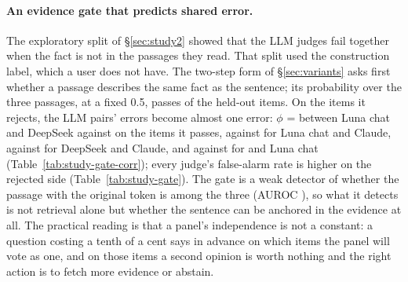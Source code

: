 \begin{table}[htbp]
\centering\small
{}
\caption{Error correlation within the two sides of the evidence gate.}
\label{tab:study-gate-corr}
\end{table}

\paragraph{An evidence gate that predicts shared error.} The exploratory split of \S\ref{sec:study2} showed that the LLM judges fail together when the fact is not in the passages they read. That split used the construction label, which a user does not have. The two-step form of \S\ref{sec:variants} asks \jev{} first whether a passage describes the same fact as the sentence; its probability over the three passages, at a fixed 0.5, passes \studyGateShare{} of the held-out items. On the items it rejects, the LLM pairs' errors become almost one error: $\phi$ = \studyGatePhiRejectLunaChatDeepseekPro{} between Luna chat and DeepSeek against \studyGatePhiPassLunaChatDeepseekPro{} on the items it passes, \studyGatePhiRejectLunaChatClaude{} against \studyGatePhiPassLunaChatClaude{} for Luna chat and Claude, \studyGatePhiRejectDeepseekProClaude{} against \studyGatePhiPassDeepseekProClaude{} for DeepSeek and Claude, and \studyGatePhiRejectJevThreeLunaChat{} against \studyGatePhiPassJevThreeLunaChat{} for \jev{} and Luna chat (Table~\ref{tab:study-gate-corr}); every judge's false-alarm rate is higher on the rejected side (Table~\ref{tab:study-gate}). The gate is a weak detector of whether the passage with the original token is among the three (AUROC \studyGateAuroc{}), so what it detects is not retrieval alone but whether the sentence can be anchored in the evidence at all. The practical reading is that a panel's independence is not a constant: a question costing a tenth of a cent says in advance on which items the panel will vote as one, and on those items a second opinion is worth nothing and the right action is to fetch more evidence or abstain.

\begin{table}[htbp]
\centering\small
{}
\caption{Pairs built with the same rule from sentences the debate's judge had not approved (\studyUnapprovedNTwoZero{} held-out items), against the benchmark's numeric pairs; the unchanged side of an unapproved pair is not a clean negative, so its false-alarm rate is shown for completeness only.}
\label{tab:study-unapproved}
\end{table}

